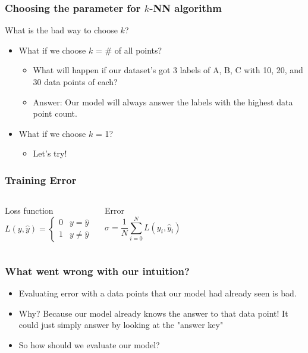 \documentclass[aspectratio=169]{beamer}
\begin{document}
\begin{frame}
	\frametitle{Choosing the parameter for $k$-NN algorithm}
	 What is the bad way to choose $k$?
	\begin{itemize}
		\item<3-> What if we choose $k$ = \# of all points?
		      \begin{itemize}
			      \item<4-> What will happen if our dataset's got 3 labels of A, B, C with 10, 20, and 30 data points of each?
			      \item<5-> Answer: Our model will always answer the labels with the highest data point count.
		      \end{itemize}
		\item<6-> What if we choose $k$ = 1?
		      \begin{itemize}
			      \item<7-> Let's try!
		      \end{itemize}
	\end{itemize}
\end{frame}

\begin{frame}
	\frametitle{Training Error}
	\begin{figure}
	\end{figure}
	\begin{columns}[t]
		\begin{block}{Loss function}
			$$L(y, \hat{y}) =
				\begin{cases}
					0 & y = \hat{y}    \\
					1 & y \neq \hat{y}
				\end{cases}
			$$
		\end{block}
		\begin{block}{Error}
			$$\sigma = \frac{1}{N}\sum_{i=0}^{N}L(y_i, \hat{y}_i)$$
		\end{block}
	\end{columns}
\end{frame}

\begin{frame}
	\frametitle{What went wrong with our intuition?}
	\begin{itemize}
		\item<2-> Evaluating error with a data points that our model had already seen is bad.
		\item<3-> Why? Because our model already knows the answer to that data point! It could just simply answer by looking at the "answer key"
		\item<4-> So how should we evaluate our model?
	\end{itemize}
\end{frame}
\end{document}

